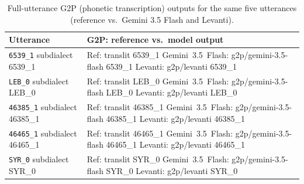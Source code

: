 \begin{table}[t]
\centering
\small
\begin{tabular}{p{} p{}}
\toprule
\textbf{Utterance} & \textbf{G2P: reference vs.\ model output} \\
\midrule
\texttt{6539\_1} \newline \scriptsize {{subdialect 6539_1}} & Ref: {{translit 6539_1}} \newline Gemini~3.5~Flash: {{g2p/gemini-3.5-flash 6539_1}} \newline Levanti: {{g2p/levanti 6539_1}} \\
\addlinespace[4pt]
\texttt{LEB\_0} \newline \scriptsize {{subdialect LEB_0}} & Ref: {{translit LEB_0}} \newline Gemini~3.5~Flash: {{g2p/gemini-3.5-flash LEB_0}} \newline Levanti: {{g2p/levanti LEB_0}} \\
\addlinespace[4pt]
\texttt{46385\_1} \newline \scriptsize {{subdialect 46385_1}} & Ref: {{translit 46385_1}} \newline Gemini~3.5~Flash: {{g2p/gemini-3.5-flash 46385_1}} \newline Levanti: {{g2p/levanti 46385_1}} \\
\addlinespace[4pt]
\texttt{46465\_1} \newline \scriptsize {{subdialect 46465_1}} & Ref: {{translit 46465_1}} \newline Gemini~3.5~Flash: {{g2p/gemini-3.5-flash 46465_1}} \newline Levanti: {{g2p/levanti 46465_1}} \\
\addlinespace[4pt]
\texttt{SYR\_0} \newline \scriptsize {{subdialect SYR_0}} & Ref: {{translit SYR_0}} \newline Gemini~3.5~Flash: {{g2p/gemini-3.5-flash SYR_0}} \newline Levanti: {{g2p/levanti SYR_0}} \\
\bottomrule
\end{tabular}
\caption{Full-utterance G2P (phonetic transcription) outputs for the same five utterances (reference vs.\ Gemini 3.5 Flash and Levanti).}
\label{tab:g2p-examples-full}
\end{table}
